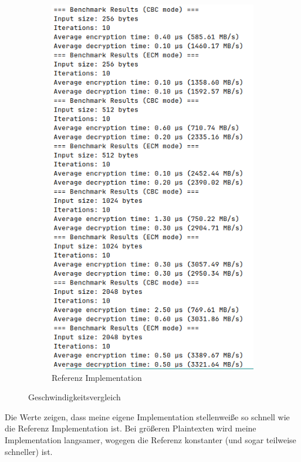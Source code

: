 \begin{figure}[h]
\begin{subfigure}[b]{0.49\textwidth}
        \centering
        \includegraphics[width=\textwidth]{img/bench/referencebench.png}
        \caption{Referenz Implementation}
        \label{fig:bench_ref}
    \end{subfigure}
    \caption{Geschwindigkeitsvergleich}
    \label{fig:benchmark}
\end{figure}
Die Werte zeigen, dass meine eigene Implementation stellenweiße so schnell wie
die Referenz Implementation ist. Bei größeren Plaintexten wird meine Implementation langsamer,
wogegen die Referenz konstanter (und sogar teilweise schneller) ist. 